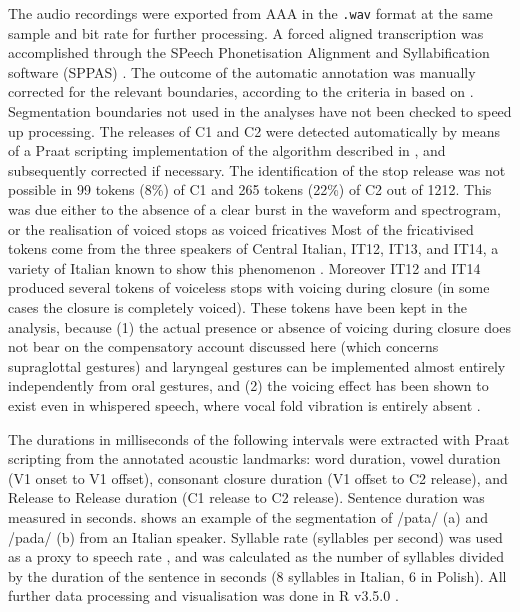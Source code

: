 \documentclass[12pt,]{article}
\begin{document}
The audio recordings were exported from AAA in the \texttt{.wav} format
at the same sample and bit rate for further processing. A forced aligned
transcription was accomplished through the SPeech Phonetisation
Alignment and Syllabification software (SPPAS) \citep{bigi2015}. The
outcome of the automatic annotation was manually corrected for the
relevant boundaries, according to the criteria in 
based on \citet{machac2009}. Segmentation boundaries not used in the
analyses have not been checked to speed up processing. The releases of
C1 and C2 were detected automatically by means of a Praat scripting
implementation of the algorithm described in
\citet{ananthapadmanabha2014}, and subsequently corrected if necessary.
The identification of the stop release was not possible in 99 tokens
(8\%) of C1 and 265 tokens (22\%) of C2 out of 1212. This was due either
to the absence of a clear burst in the waveform and spectrogram, or the
realisation of voiced stops as voiced fricatives Most of the
fricativised tokens come from the three speakers of Central Italian,
IT12, IT13, and IT14, a variety of Italian known to show this phenomenon
\citealt{hualde2011}. Moreover IT12 and IT14 produced several tokens of
voiceless stops with voicing during closure (in some cases the closure
is completely voiced). These tokens have been kept in the analysis,
because (1) the actual presence or absence of voicing during closure
does not bear on the compensatory account discussed here (which concerns
supraglottal gestures) and laryngeal gestures can be implemented almost
entirely independently from oral gestures, and (2) the voicing effect
has been shown to exist even in whispered speech, where vocal fold
vibration is entirely absent \citep{sharf1964}.

The durations in milliseconds of the following intervals were extracted
with Praat scripting from the annotated acoustic landmarks: word
duration, vowel duration (V1 onset to V1 offset), consonant closure
duration (V1 offset to C2 release), and Release to Release duration (C1
release to C2 release). Sentence duration was measured in seconds.
 shows an example of the segmentation of /pata/ (a)
and /pada/ (b) from an Italian speaker. Syllable rate (syllables per
second) was used as a proxy to speech rate \citep{plug2018}, and was
calculated as the number of syllables divided by the duration of the
sentence in seconds (8 syllables in Italian, 6 in Polish). All further
data processing and visualisation was done in R v3.5.0
\citep{r-core-team2018, wickham2017}.
\end{document}
